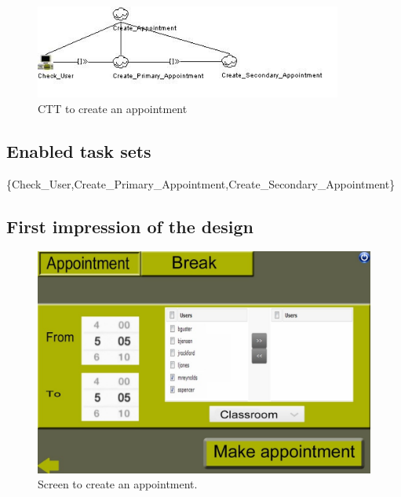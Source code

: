 \documentclass[11pt, a4paper,svglistings]{report}
\begin{document}
\begin{figure}[H]
\centering
    \includegraphics[width=0.9\textwidth]{CreateAppointment.jpg}
  \caption[Create appointment CTT]{\label{fig:CreateAppointment}CTT to create an appointment}
\end{figure}

\subsection{Enabled task sets}

\{Check\_User,Create\_Primary\_Appointment,Create\_Secondary\_Appointment\}

\subsection{First impression of the design}

\begin{figure}[H]
\centering
    \includegraphics[width=1\textwidth]{Appointment.jpg}
  \caption[Appointment screen]{\label{fig:Appointment}Screen to create an appointment.}
\end{figure}

\end{document}
